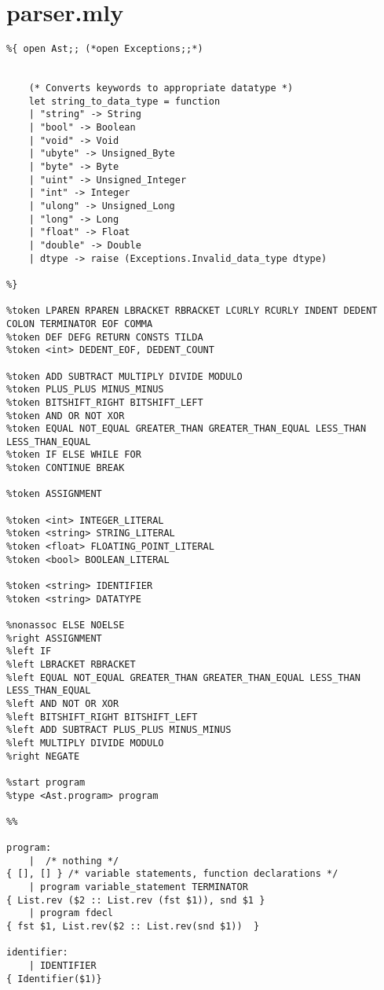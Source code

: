 \section{parser.mly}
\begin{verbatim}
%{ open Ast;; (*open Exceptions;;*)

    
    (* Converts keywords to appropriate datatype *)
    let string_to_data_type = function
	| "string" -> String
    | "bool" -> Boolean
    | "void" -> Void
    | "ubyte" -> Unsigned_Byte
    | "byte" -> Byte
    | "uint" -> Unsigned_Integer
	| "int" -> Integer
    | "ulong" -> Unsigned_Long
    | "long" -> Long
    | "float" -> Float 
    | "double" -> Double
	| dtype -> raise (Exceptions.Invalid_data_type dtype)

%}

%token LPAREN RPAREN LBRACKET RBRACKET LCURLY RCURLY INDENT DEDENT COLON TERMINATOR EOF COMMA
%token DEF DEFG RETURN CONSTS TILDA
%token <int> DEDENT_EOF, DEDENT_COUNT

%token ADD SUBTRACT MULTIPLY DIVIDE MODULO
%token PLUS_PLUS MINUS_MINUS
%token BITSHIFT_RIGHT BITSHIFT_LEFT
%token AND OR NOT XOR
%token EQUAL NOT_EQUAL GREATER_THAN GREATER_THAN_EQUAL LESS_THAN LESS_THAN_EQUAL
%token IF ELSE WHILE FOR
%token CONTINUE BREAK 

%token ASSIGNMENT 

%token <int> INTEGER_LITERAL
%token <string> STRING_LITERAL
%token <float> FLOATING_POINT_LITERAL
%token <bool> BOOLEAN_LITERAL

%token <string> IDENTIFIER
%token <string> DATATYPE

%nonassoc ELSE NOELSE
%right ASSIGNMENT
%left IF
%left LBRACKET RBRACKET
%left EQUAL NOT_EQUAL GREATER_THAN GREATER_THAN_EQUAL LESS_THAN LESS_THAN_EQUAL
%left AND NOT OR XOR
%left BITSHIFT_RIGHT BITSHIFT_LEFT
%left ADD SUBTRACT PLUS_PLUS MINUS_MINUS
%left MULTIPLY DIVIDE MODULO
%right NEGATE 

%start program  
%type <Ast.program> program

%%

program:
    |  /* nothing */                                                    { [], [] } /* variable statements, function declarations */ 
    | program variable_statement TERMINATOR                             { List.rev ($2 :: List.rev (fst $1)), snd $1 }
    | program fdecl                                                     { fst $1, List.rev($2 :: List.rev(snd $1))  }

identifier:
    | IDENTIFIER                                                        { Identifier($1)}


\end{verbatim}
